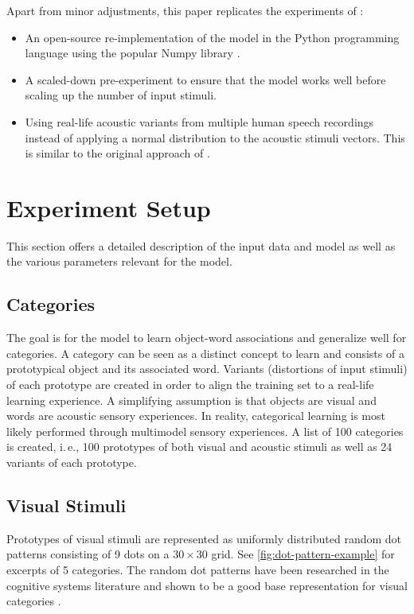 \documentclass[twocolumn]{article}
\begin{document}
Apart from minor adjustments, this paper replicates the experiments of \textcite{gliozzi_visual_2018}:
\begin{itemize}
    \item
        An open-source re-implementation of the model in the Python programming language using the popular Numpy library \parencite{numpy_developers_numpy_2018}.
    \item
        A scaled-down pre-experiment to ensure that the model works well before scaling up the number of input stimuli.
    \item
        Using real-life acoustic variants from multiple human speech recordings instead of applying a normal distribution to the acoustic stimuli vectors. This is similar to the original approach of \textcite{mayor_neurocomputational_2010}.
\end{itemize}

\section{Experiment Setup} \label{sec:experiment-setup}
This section offers a detailed description of the input data and model as well as the various parameters relevant for the model.

\subsection{Categories} \label{sub:categories}
The goal is for the model to learn object-word associations and generalize well for categories. A category can be seen as a distinct concept to learn and consists of a prototypical object and its associated word. Variants (distortions of input stimuli) of each prototype are created in order to align the training set to a real-life learning experience. A simplifying assumption is that objects are visual and words are acoustic sensory experiences. In reality, categorical learning is most likely performed through multimodel sensory experiences. A list of 100 categories is created, i.\,e., 100 prototypes of both visual and acoustic stimuli as well as 24 variants of each prototype.

\subsection{Visual Stimuli} \label{sub:visual-stimuli}
Prototypes of visual stimuli are represented as uniformly distributed random dot patterns consisting of 9 dots on a $30 \times 30$ grid. See \autoref{fig:dot-pattern-example} for excerpts of 5 categories. The random dot patterns have been researched in the cognitive systems literature and shown to be a good base representation for visual categories \parencite{posner_perceived_1967}.
\end{document}
